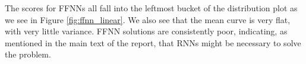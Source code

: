 \documentclass[12pt]{article}
\begin{document}
\begin{appendices}
The scores for FFNNs all fall into the leftmost bucket of the distribution plot as we see in Figure \ref{fig:ffnn_linear}. We also see that the mean curve is very flat, with very little variance. FFNN solutions are consistently poor, indicating, as mentioned in the main text of the report, that RNNs might be necessary to solve the problem.

\begin{figure}[!tbp]
  \centering
  \hfill
  \hfill
  
  \hfill
  \hfill
  

\end{figure}
\end{appendices}
\end{document}
